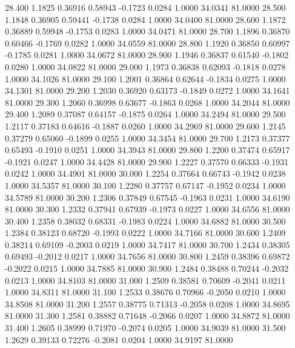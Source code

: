   28.400   1.1825   0.36916   0.58943  -0.1723   0.0284   1.0000  34.0341  81.0000
  28.500   1.1848   0.36905   0.59441  -0.1738   0.0284   1.0000  34.0400  81.0000
  28.600   1.1872   0.36889   0.59948  -0.1753   0.0283   1.0000  34.0471  81.0000
  28.700   1.1896   0.36870   0.60466  -0.1769   0.0282   1.0000  34.0559  81.0000
  28.800   1.1920   0.36850   0.60997  -0.1785   0.0281   1.0000  34.0672  81.0000
  28.900   1.1946   0.36837   0.61540  -0.1802   0.0280   1.0000  34.0822  81.0000
  29.000   1.1973   0.36838   0.62093  -0.1818   0.0278   1.0000  34.1026  81.0000
  29.100   1.2001   0.36864   0.62644  -0.1834   0.0275   1.0000  34.1301  81.0000
  29.200   1.2030   0.36920   0.63173  -0.1849   0.0272   1.0000  34.1641  81.0000
  29.300   1.2060   0.36998   0.63677  -0.1863   0.0268   1.0000  34.2044  81.0000
  29.400   1.2089   0.37087   0.64157  -0.1875   0.0264   1.0000  34.2494  81.0000
  29.500   1.2117   0.37183   0.64616  -0.1887   0.0260   1.0000  34.2969  81.0000
  29.600   1.2145   0.37279   0.65060  -0.1899   0.0255   1.0000  34.3454  81.0000
  29.700   1.2173   0.37377   0.65493  -0.1910   0.0251   1.0000  34.3943  81.0000
  29.800   1.2200   0.37474   0.65917  -0.1921   0.0247   1.0000  34.4428  81.0000
  29.900   1.2227   0.37570   0.66333  -0.1931   0.0242   1.0000  34.4901  81.0000
  30.000   1.2254   0.37664   0.66743  -0.1942   0.0238   1.0000  34.5357  81.0000
  30.100   1.2280   0.37757   0.67147  -0.1952   0.0234   1.0000  34.5789  81.0000
  30.200   1.2306   0.37849   0.67545  -0.1963   0.0231   1.0000  34.6190  81.0000
  30.300   1.2332   0.37941   0.67939  -0.1973   0.0227   1.0000  34.6556  81.0000
  30.400   1.2358   0.38032   0.68331  -0.1983   0.0224   1.0000  34.6882  81.0000
  30.500   1.2384   0.38123   0.68720  -0.1993   0.0222   1.0000  34.7166  81.0000
  30.600   1.2409   0.38214   0.69109  -0.2003   0.0219   1.0000  34.7417  81.0000
  30.700   1.2434   0.38305   0.69493  -0.2012   0.0217   1.0000  34.7656  81.0000
  30.800   1.2459   0.38396   0.69872  -0.2022   0.0215   1.0000  34.7885  81.0000
  30.900   1.2484   0.38488   0.70244  -0.2032   0.0213   1.0000  34.8103  81.0000
  31.000   1.2509   0.38581   0.70609  -0.2041   0.0211   1.0000  34.8311  81.0000
  31.100   1.2533   0.38676   0.70966  -0.2050   0.0210   1.0000  34.8508  81.0000
  31.200   1.2557   0.38775   0.71313  -0.2058   0.0208   1.0000  34.8695  81.0000
  31.300   1.2581   0.38882   0.71648  -0.2066   0.0207   1.0000  34.8872  81.0000
  31.400   1.2605   0.38999   0.71970  -0.2074   0.0205   1.0000  34.9039  81.0000
  31.500   1.2629   0.39133   0.72276  -0.2081   0.0204   1.0000  34.9197  81.0000
